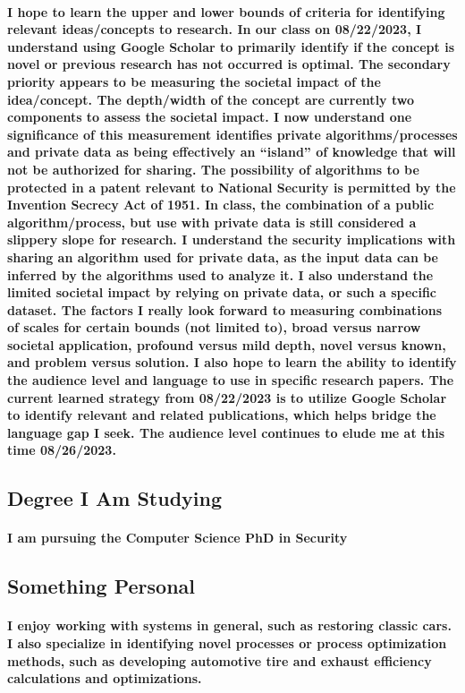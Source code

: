 \documentclass{article}
\begin{document}
\paragraph{\quad I hope to learn the upper and lower bounds of criteria for identifying relevant ideas/concepts to research. In our class on 08/22/2023, I understand using Google Scholar to primarily identify if the concept is novel or previous research has not occurred is optimal. The secondary priority appears to be measuring the societal impact of the idea/concept. The depth/width of the concept are currently two components to assess the societal impact. I now understand one significance of this measurement identifies private algorithms/processes and private data as being effectively an 
“island” of knowledge that will not be authorized for sharing. The possibility of algorithms to be protected in a patent relevant to National Security is permitted by the Invention Secrecy Act of 1951. In class, the combination of a public algorithm/process, but use with private data is still considered a slippery slope for research. I understand the security implications with sharing an algorithm used for private data, as the input data can be inferred by the algorithms used to analyze it. I also understand the limited societal impact by relying on private data, or such a specific dataset. The factors I really look forward to measuring combinations of scales for certain bounds (not limited to), broad versus narrow societal application, profound versus mild depth, novel versus known, and problem versus solution. I also hope to learn the ability to identify the audience level and language to use in specific research papers. The current learned strategy from 08/22/2023 is to utilize Google Scholar to identify relevant and related publications, which helps bridge the language gap I seek. The audience level continues to elude me at this time 08/26/2023.}
\subsection{Degree I Am Studying}
\paragraph{\quad I am pursuing the Computer Science PhD in Security}
\subsection{Something Personal}
\paragraph{\quad I enjoy working with systems in general, such as restoring classic cars. I also specialize in identifying novel processes or process optimization methods, such as developing automotive tire and exhaust efficiency calculations and optimizations.}
\end{document}

